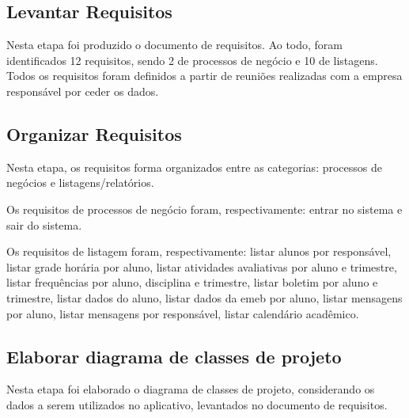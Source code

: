 \subsection{Levantar Requisitos}

Nesta etapa foi produzido o documento de requisitos. Ao todo, foram identificados 12 requisitos, sendo 2 de processos de negócio e 10 de listagens. Todos os requisitos foram definidos a partir de reuniões realizadas com a empresa responsável por ceder os dados.

\subsection{Organizar Requisitos}

Nesta etapa, os requisitos forma organizados entre as categorias: processos de negócios e listagens/relatórios.

Os requisitos de processos de negócio foram, respectivamente: entrar no sistema e sair do sistema.

Os requisitos de listagem foram, respectivamente: listar alunos por responsável, listar grade horária por aluno, listar atividades avaliativas por aluno e trimestre, listar frequências por aluno, disciplina e trimestre, listar boletim por aluno e trimestre, listar dados do aluno, listar dados da emeb por aluno, listar mensagens por aluno, listar mensagens por responsável, listar calendário acadêmico.

\subsection{Elaborar diagrama de classes de projeto}

Nesta etapa foi elaborado o diagrama de classes de projeto, considerando os dados a serem utilizados no aplicativo, levantados no documento de requisitos.

